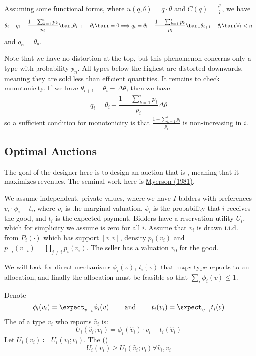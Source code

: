 \documentclass[10pt]{article}
\begin{document}
Assuming some functional forms, where $u(q,\theta) = q\cdot \theta$ and $C(q) = \frac{q^2}{2}$, we have\[\theta_i-q_i - \frac{1 - \sum_{k=1}^i p_k}{p_i} \barl \theta_{i+1}-\theta_i\barr = 0 \Longrightarrow q_i = \theta_i - \frac{1 - \sum_{k=1}^i p_k}{p_i} \barl \theta_{i+1}-\theta_i\barr  \forall i < n \]and $q_n = \theta_n$. 

\begin{remark}
	Note that we have no distortion at the top, but this phenomenon concerns only a type with probability $p_n$. All types below the highest are distorted downwards, meaning they are sold less than efficient quantities. It remains to check monotonicity. If we have $\theta_{i+1}-\theta_i = \Delta \theta$, then we have \[q_i = \theta_i - \frac{1 - \sum_{k=1}^i p_i}{p_i} \Delta \theta\]so a sufficient condition for monotonicity is that $\frac{1 - \sum_{k=1}^i p_i}{p_i}$ is non-increasing in $i$.
\end{remark}


\subsection{Optimal Auctions}

\begin{remark}
	The goal of the designer here is to design an auction that is , meaning that it maximizes revenues. The seminal work here is \href{https://www.jstor.org/stable/3689266?seq=1}{Myerson (1981)}.
\end{remark}

\begin{model}  
	We assume independent, private values, where we have $I$ bidders with preferences $v_i \cdot \phi_i - t_i$, where $v_i$ is the marginal valuation, $\phi_i$ is the probability that $i$ receives the good, and $t_i$ is the expected payment. Bidders have a reservation utility $U_i$, which for simplicity we assume is zero for all $i$. Assume that $v_i$ is drawn i.i.d. from $P_i(\cdot)$ which has support $[\underline{v},\bar{v}]$, density $p_i(v_i)$ and $p_{-i}(v_{-i}) = \prod_{j\ne i} p_i(v_i)$. The seller has a valuation $v_0$ for the good.
	
	We will look for direct mechanisms $\phi_i(v)$, $t_i(v)$ that maps type reports to an allocation, and finally the allocation must be feasible so that $\sum_i \phi_i(v) \le 1$.
\end{model}

\begin{definition}
	Denote \[\phi_i(v_i) = \expect_{v_{-i}} \phi_i(v) \qquad \text{ and } \qquad t_i(v_i) = \expect_{v_{-i}} t_i(v)\]The  of a type $v_i$ who reports $\hat{v}_i$ is:\[U_i(\hat{v}_i;v_i) = \phi_i(\hat{v}_i)\cdot v_i - t_i(\hat{v}_i)\]Let $U_i(v_i) \coloneqq U_i(v_i;v_i)$. The  ()\[U_i(v_i) \ge U_i(\hat{v}_i;v_i) \forall \hat{v}_i,v_i\]
\end{definition}
\end{document}
